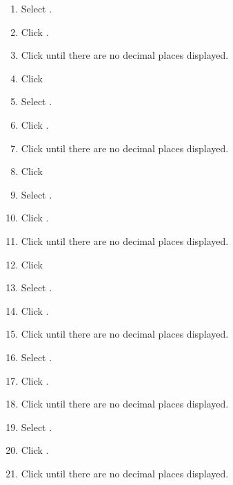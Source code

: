 \begin{enumerate}
	\item Select .
	\item Click .
	\item Click  until there are no decimal places displayed.
	\item Click  

	\item Select .
	\item Click .
	\item Click  until there are no decimal places displayed.
	\item Click  

	\item Select .
	\item Click .
	\item Click  until there are no decimal places displayed.
	\item Click  

	\item Select .
	\item Click .
	\item Click  until there are no decimal places displayed.

	\item Select .
	\item Click .
	\item Click  until there are no decimal places displayed.

	\item Select .
	\item Click .
	\item Click  until there are no decimal places displayed.


\end{enumerate}
